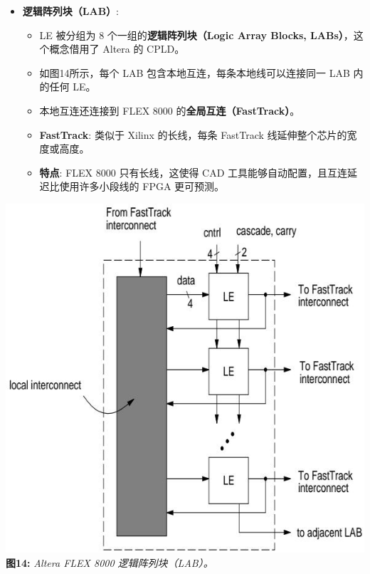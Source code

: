 \begin{frame}
\begin{itemize}
\tightlist
\item
    \textbf{逻辑阵列块（LAB）}:

    \begin{itemize}
    \tightlist
    \item
    LE 被分组为 8 个一组的\textbf{逻辑阵列块（Logic Array Blocks,
    LABs）}，这个概念借用了 Altera 的 CPLD。
    \item
    如图14所示，每个 LAB 包含本地互连，每条本地线可以连接同一 LAB
    内的任何 LE。
    \item
    本地互连还连接到 FLEX 8000 的\textbf{全局互连（FastTrack）}。
    \item
    \textbf{FastTrack}: 类似于 Xilinx 的长线，每条 FastTrack
    线延伸整个芯片的宽度或高度。
    \item
    \textbf{特点}: FLEX 8000 只有长线，这使得 CAD
    工具能够自动配置，且互连延迟比使用许多小段线的 FPGA 更可预测。
    \end{itemize}
\end{itemize}

\includegraphics[keepaspectratio]{img1/FLEX800LAB.jpeg}
\textbf{图14:} \emph{Altera FLEX 8000 逻辑阵列块（LAB）。}
\end{frame}

